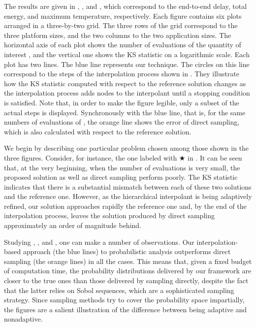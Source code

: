 The results are given in ,
, and , which
correspond to the end-to-end delay, total energy, and maximum temperature,
respectively. Each figure contains six plots arranged in a three-by-two grid.
The three rows of the grid correspond to the three platform sizes, and the two
columns to the two application sizes. The horizontal axis of each plot shows the
number of evaluations of the quantity of interest \g, and the vertical one shows
the \ac{KS} statistic on a logarithmic scale. Each plot has two lines. The blue
line represents our technique. The circles on this line correspond to the steps
of the interpolation process shown in . They illustrate
how the \ac{KS} statistic computed with respect to the reference solution
changes as the interpolation process adds nodes to the interpolant until a
stopping condition is satisfied. Note that, in order to make the figure legible,
only a subset of the actual steps is displayed. Synchronously with the blue
line, that is, for the same numbers of evaluations of \g, the orange line shows
the error of direct sampling, which is also calculated with respect to the
reference solution.

We begin by describing one particular problem chosen among those shown in the
three figures. Consider, for instance, the one labeled with $\bigstar$ in
. It can be seen that, at the very beginning, when
the number of evaluations is very small, the proposed solution as well as direct
sampling perform poorly. The \ac{KS} statistic indicates that there is a
substantial mismatch between each of these two solutions and the reference one.
However, as the hierarchical interpolant is being adaptively refined, our
solution approaches rapidly the reference one and, by the end of the
interpolation process, leaves the solution produced by direct sampling
approximately an order of magnitude behind.

Studying , , and
, one can make a number of observations. Our
interpolation-based approach (the blue lines) to probabilistic analysis
outperforms direct sampling (the orange lines) in all the cases. This means
that, given a fixed budget of computation time, the probability distributions
delivered by our framework are closer to the true ones than those delivered by
sampling \g directly, despite the fact that the latter relies on Sobol
sequences, which are a sophisticated sampling strategy. Since sampling methods
try to cover the probability space impartially, the figures are a salient
illustration of the difference between being adaptive and nonadaptive.

